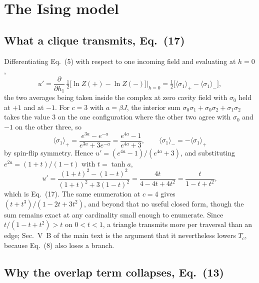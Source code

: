 \documentclass[aps,pre,onecolumn,superscriptaddress,floatfix,nofootinbib]{revtex4-2}
\newcommand{\ave}[1]{\langle #1 \rangle}
\begin{document}
\section{The Ising model}
\label{sec:ising}

\subsection{What a clique transmits, Eq.~(17)}

Differentiating Eq.~(5) with respect to one incoming field and evaluating at
$h=0$,
\begin{equation}
  u'=\frac{\partial}{\partial h_1}\,\tfrac12\big[\ln Z(+)-\ln Z(-)\big]\bigg|_{h=0}
   =\tfrac12\Big[\ave{\sigma_1}_+-\ave{\sigma_1}_-\Big],
  \label{eq:updef}
\end{equation}
the two averages being taken inside the complex at zero cavity field with
$\sigma_0$ held at $+1$ and at $-1$. For $c=3$ with $a=\beta J$, the interior
sum $\sigma_0\sigma_1+\sigma_0\sigma_2+\sigma_1\sigma_2$ takes the value $3$ on
the one configuration where the other two agree with $\sigma_0$ and $-1$ on the
other three, so
\begin{equation}
  \ave{\sigma_1}_+=\frac{e^{3a}-e^{-a}}{e^{3a}+3e^{-a}}
                  =\frac{e^{4a}-1}{e^{4a}+3},
  \qquad \ave{\sigma_1}_-=-\ave{\sigma_1}_+
\end{equation}
by spin-flip symmetry. Hence $u'=(e^{4a}-1)/(e^{4a}+3)$, and substituting
$e^{2a}=(1+t)/(1-t)$ with $t=\tanh a$,
\begin{equation}
  u'=\frac{(1+t)^2-(1-t)^2}{(1+t)^2+3(1-t)^2}
    =\frac{4t}{4-4t+4t^{2}}=\frac{t}{1-t+t^{2}} ,
\end{equation}
which is Eq.~(17). The same enumeration at $c=4$ gives
$(t+t^{3})/(1-2t+3t^{2})$, and beyond that no useful closed form, though the sum
remains exact at any cardinality small enough to enumerate. Since
$t/(1-t+t^2)>t$ on $0<t<1$, a triangle transmits more per traversal than an
edge; Sec.~V~B of the main text is the argument that it nevertheless lowers
$T_c$, because Eq.~(8) also loses a branch.

\subsection{Why the overlap term collapses, Eq.~(13)}
\end{document}
